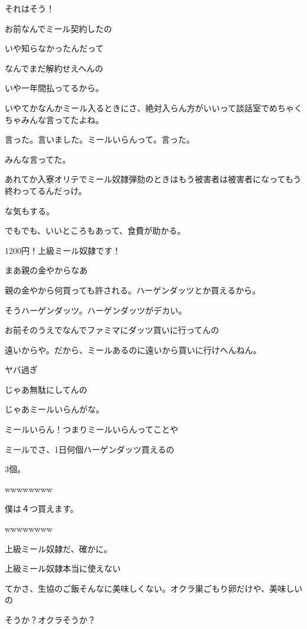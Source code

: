 \begin{multicols}{3}
それはそう！

お前なんでミール契約したの

いや知らなかったんだって

なんでまだ解約せえへんの

いや一年間払ってるから。

いやてかなんかミール入るときにさ、絶対入らん方がいいって談話室でめちゃくちゃみんな言ってたよね。

言った。言いました。ミールいらんって。言った。

みんな言ってた。

あれてか入寮オリテでミール奴隷弾劾のときはもう被害者は被害者になってもう終わってるんだっけ。

な気もする。

でもでも、いいところもあって、食費が助かる。

1200円！上級ミール奴隷です！

まあ親の金やからなあ

親の金やから何買っても許される。ハーゲンダッツとか買えるから。

そうハーゲンダッツ。ハーゲンダッツがデカい。

お前そのうえでなんでファミマにダッツ買いに行ってんの

遠いからや。だから、ミールあるのに遠いから買いに行けへんねん。

ヤバ過ぎ

じゃあ無駄にしてんの

じゃあミールいらんがな。

ミールいらん！つまりミールいらんってことや

ミールでさ、1日何個ハーゲンダッツ買えるの

3個。

wwwwwwww

僕は４つ買えます。

wwwwwwww

上級ミール奴隷だ、確かに。

上級ミール奴隷本当に使えない

てかさ、生協のご飯そんなに美味しくない。オクラ巣ごもり卵だけや、美味しいの

そうか？オクラそうか？


\end{multicols}
